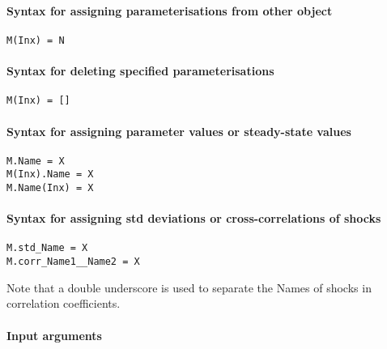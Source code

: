 


	\paragraph{Syntax for assigning parameterisations from other
object}\label{syntax-for-assigning-parameterisations-from-other-object}

\begin{verbatim}
M(Inx) = N
\end{verbatim}

\paragraph{Syntax for deleting specified
parameterisations}\label{syntax-for-deleting-specified-parameterisations}

\begin{verbatim}
M(Inx) = []
\end{verbatim}

\paragraph{Syntax for assigning parameter values or steady-state
values}\label{syntax-for-assigning-parameter-values-or-steady-state-values}

\begin{verbatim}
M.Name = X
M(Inx).Name = X
M.Name(Inx) = X
\end{verbatim}

\paragraph{Syntax for assigning std deviations or cross-correlations of
shocks}\label{syntax-for-assigning-std-deviations-or-cross-correlations-of-shocks}

\begin{verbatim}
M.std_Name = X
M.corr_Name1__Name2 = X
\end{verbatim}

Note that a double underscore is used to separate the Names of shocks in
correlation coefficients.

\paragraph{Input arguments}\label{input-arguments}

